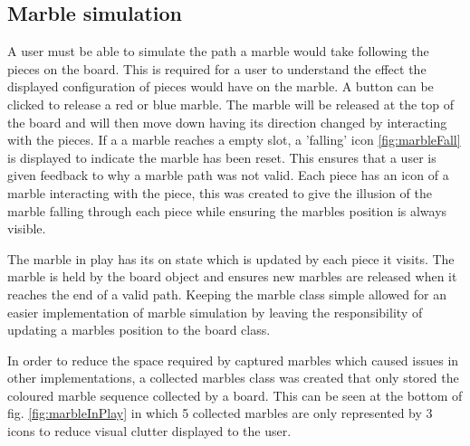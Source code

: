 \documentclass{l4proj}
\begin{document}
\subsection{Marble simulation}
A user must be able to simulate the path a marble would take following the pieces on the board. This is required for a user to understand the effect the displayed configuration of pieces would have on the marble. A button can be clicked to release a red or blue marble. The marble will be released at the top of the board and will then move down having its direction changed by interacting with the pieces. If a a marble reaches a empty slot, a 'falling' icon \ref{fig:marbleFall} is displayed to indicate the marble has been reset. This ensures that a user is given feedback to why a marble path was not valid. Each piece has an icon of a marble interacting with the piece, this was created to give the illusion of the marble falling through each piece while ensuring the marbles position is always visible.

The marble in play has its on state which is updated by each piece it visits. The marble is held by the board object and ensures new marbles are released when it reaches the end of a valid path. Keeping the marble class simple allowed for an easier implementation of marble simulation by leaving the responsibility of updating a marbles position to the board class. 


In order to reduce the space required by captured marbles which caused issues in other implementations, a collected marbles class was created that only stored the coloured marble sequence collected by a board. This can be seen at the bottom of fig. \ref{fig:marbleInPlay} in which 5 collected marbles are only represented by 3 icons to reduce visual clutter displayed to the user.
\end{document}
